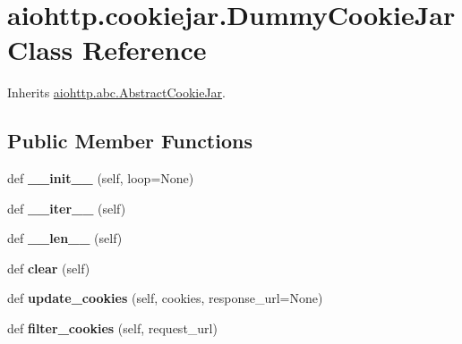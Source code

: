 \hypertarget{classaiohttp_1_1cookiejar_1_1_dummy_cookie_jar}{}\section{aiohttp.\+cookiejar.\+Dummy\+Cookie\+Jar Class Reference}
\label{classaiohttp_1_1cookiejar_1_1_dummy_cookie_jar}


Inherits \hyperlink{classaiohttp_1_1abc_1_1_abstract_cookie_jar}{aiohttp.\+abc.\+Abstract\+Cookie\+Jar}.

\subsection*{Public Member Functions}
\begin{DoxyCompactItemize}
\item 
\mbox{\label{classaiohttp_1_1cookiejar_1_1_dummy_cookie_jar_a01dd3ef60e69e9c65de38c9230566b8c}} 
def {\bfseries \+\_\+\+\_\+init\+\_\+\+\_\+} (self, loop=None)
\item 
\mbox{\label{classaiohttp_1_1cookiejar_1_1_dummy_cookie_jar_a378a44a3418634f68a6922ba890025e2}} 
def {\bfseries \+\_\+\+\_\+iter\+\_\+\+\_\+} (self)
\item 
\mbox{\label{classaiohttp_1_1cookiejar_1_1_dummy_cookie_jar_a2a8dc145a0d1b20a2a44b1414661974a}} 
def {\bfseries \+\_\+\+\_\+len\+\_\+\+\_\+} (self)
\item 
\mbox{\label{classaiohttp_1_1cookiejar_1_1_dummy_cookie_jar_aff0b104ba45ea673915b88c6847c4103}} 
def {\bfseries clear} (self)
\item 
\mbox{\label{classaiohttp_1_1cookiejar_1_1_dummy_cookie_jar_aeb5f1f4742ef1d6e8ed2f8615b5d0097}} 
def {\bfseries update\+\_\+cookies} (self, cookies, response\+\_\+url=None)
\item 
\mbox{\label{classaiohttp_1_1cookiejar_1_1_dummy_cookie_jar_a9a2affff9e60f8f4f50c515a0a43022f}} 
def {\bfseries filter\+\_\+cookies} (self, request\+\_\+url)
\end{DoxyCompactItemize}


